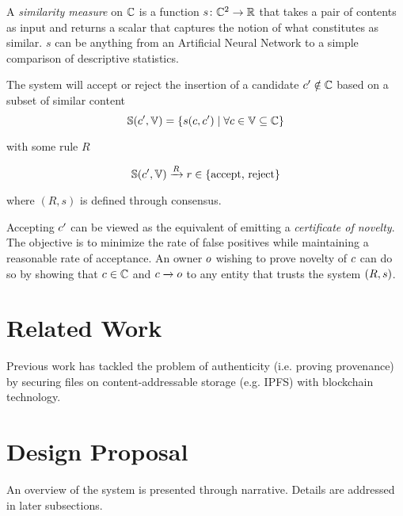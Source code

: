 \documentclass[conference]{IEEEtran}
\begin{document}
A \emph{similarity measure} on ${{\mathbb{C}}}$ is a function ${s} \colon {{\mathbb{C}}}^2 \to \mathbb{R}$ that takes a pair of contents as input and returns a scalar that captures the notion of what constitutes as similar. $s$ can be anything from an Artificial Neural Network to a simple comparison of descriptive statistics.

The system will accept or reject the insertion of a candidate ${c}^\prime \notin {{\mathbb{C}}}$ based on a subset of similar content $${\mathbb{S}}({c}^\prime, {\mathbb{V}}) = \left\{ {s}({c},{c}^\prime) \mid \forall {c} \in {\mathbb{V}} \subseteq {{\mathbb{C}}} \right\}$$

with some rule $R$ 

$${\mathbb{S}}({c}^\prime, {\mathbb{V}}) \xrightarrow{R} r \in \text{\{accept, reject\}}$$

where $(R, s)$ is defined through consensus.

Accepting ${c}^\prime$ can be viewed as the equivalent of emitting a \emph{certificate of novelty}. The objective is to minimize the rate of false positives while maintaining a reasonable rate of acceptance. An owner ${o}$ wishing to prove novelty of ${c}$ can do so by showing that ${c} \in {{\mathbb{C}}}$ and ${c} \xrightarrow{} {o}$ to any entity that trusts the system $\left(R, {s} \right)$.

\section{Related Work}
Previous work has tackled the problem of authenticity (i.e. proving provenance) by securing files on content-addressable storage (e.g. IPFS) with blockchain technology. \cite{hasan2019combating}
\section{Design Proposal}
An overview of the system is presented through narrative. Details are addressed in later subsections. 
\end{document}
